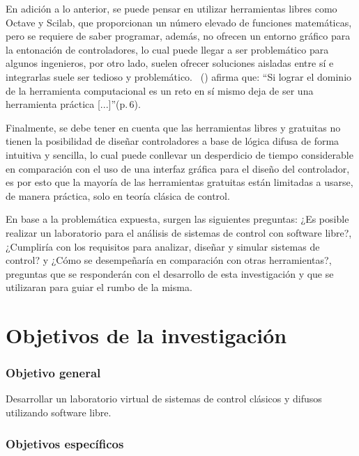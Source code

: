 	En adición a lo anterior, se puede pensar en utilizar herramientas libres como Octave y Scilab, que proporcionan un número elevado de funciones matemáticas, pero se requiere de saber programar, además, no ofrecen un entorno gráfico para la entonación de controladores, lo cual puede llegar a ser problemático para algunos ingenieros, por otro lado, suelen ofrecer soluciones aisladas entre sí e integrarlas suele ser tedioso y problemático. \citeauthor{Suarez}~(\citeyear{Suarez}) afirma que: \enquote{Si lograr el dominio de la herramienta computacional es un reto en sí mismo deja de ser una herramienta práctica [...]}(p.$\,$6).
	
	Finalmente, se debe tener en cuenta que las herramientas libres y gratuitas no tienen la posibilidad de diseñar controladores a base de lógica difusa de forma intuitiva y sencilla, lo cual puede conllevar un desperdicio de tiempo considerable en comparación con el uso de una interfaz gráfica para el diseño del controlador, es por esto que la mayoría de las herramientas gratuitas están limitadas a usarse, de manera práctica, solo en teoría clásica de control. 
	
	En base a la problemática expuesta, surgen las siguientes preguntas: ¿Es posible realizar un laboratorio para el análisis de sistemas de control con software libre?, ¿Cumpliría con los requisitos para analizar, diseñar y simular sistemas de control? y ¿Cómo se desempeñaría en comparación con otras herramientas?, preguntas que se responderán con el desarrollo de esta investigación y que se utilizaran para guiar el rumbo de la misma.
	
\section{Objetivos de la investigación}
	
	\subsubsection{Objetivo general}
		
		Desarrollar un laboratorio virtual de sistemas de control clásicos y difusos utilizando software libre.
		
	\subsubsection{Objetivos específicos}
		
